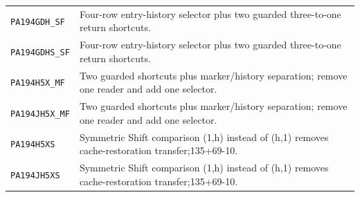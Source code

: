 \begin{longtable}{@{}p{.29\linewidth}p{.65\linewidth}@{}}
\texttt{PA194GDH\_\allowbreak SF} & Four-row entry-history selector plus two guarded three-to-one return shortcuts.\\[3pt]
\texttt{PA194GDHS\_\allowbreak SF} & Four-row entry-history selector plus two guarded three-to-one return shortcuts.\\[3pt]
\texttt{PA194H5X\_\allowbreak MF} & Two guarded shortcuts plus marker/history separation; remove one reader and add one selector.\\[3pt]
\texttt{PA194JH5X\_\allowbreak MF} & Two guarded shortcuts plus marker/history separation; remove one reader and add one selector.\\[3pt]
\texttt{PA194H5XS} & Symmetric Shift comparison (1,h) instead of (h,1) removes cache-restoration transfer;135+69-10.\\[3pt]
\texttt{PA194JH5XS} & Symmetric Shift comparison (1,h) instead of (h,1) removes cache-restoration transfer;135+69-10.\\[3pt]
\end{longtable}\endgroup
